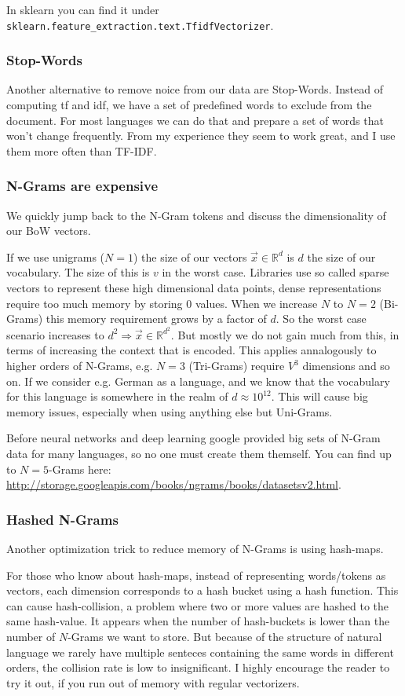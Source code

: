 \documentclass[a4paper]{article}
\begin{document}
In sklearn you can find it under \lstinline{sklearn.feature_extraction.text.TfidfVectorizer}.

\subsubsection{Stop-Words}
Another alternative to remove noice from our data are Stop-Words.
Instead of computing tf and idf, we have a set of predefined words to exclude from the document.
For most languages we can do that and prepare a set of words that won't change frequently.
From my experience they seem to work great, and I use them more often than TF-IDF.

\subsubsection{N-Grams are expensive}
We quickly jump back to the N-Gram tokens and discuss the dimensionality of our BoW vectors.

If we use unigrams ($N = 1$) the size of our vectors $\vec{x} \in \mathbb{R}^d$ is $d$ the size of our vocabulary.
The size of this is $v$ in the worst case. Libraries use so called sparse vectors to represent these
high dimensional data points, dense representations require too much memory by storing $0$ values.
When we increase $N$ to $N=2$ (Bi-Grams) this memory requirement grows by a factor of $d$. So the worst case
scenario increases to $d^2 \Rightarrow \vec{x} \in \mathbb{R}^{d^2}$.
But mostly we do not gain much from this, in terms of increasing the context that is encoded.
This applies annalogously to higher orders of N-Grams, e.g. $N=3$ (Tri-Grams) require $V^3$ dimensions and so on.
If we consider e.g. German as a language, and we know that the vocabulary for this language is somewhere in the realm of $d \approx 10^{12}$.
This will cause big memory issues, especially when using anything else but Uni-Grams.

Before neural networks and deep learning google provided big sets of N-Gram data for many languages, so no one must create them
themself. You can find up to $N=5$-Grams here: \url{http://storage.googleapis.com/books/ngrams/books/datasetsv2.html}.

\subsubsection{Hashed N-Grams}
Another optimization trick to reduce memory of N-Grams is using hash-maps.

For those who know about hash-maps, instead of representing words/tokens as vectors, each dimension corresponds to a hash bucket
using a hash function.
This can cause hash-collision, a problem where two or more values are hashed to the same hash-value. It appears when the number of hash-buckets
is lower than the number of $N$-Grams we want to store.
But because of the structure of natural language we rarely have multiple senteces containing the same words in different orders, the collision rate is low to insignificant.
I highly encourage the reader to try it out, if you run out of memory with regular vectorizers.
\end{document}
